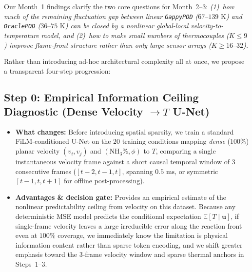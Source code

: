 \documentclass[11pt,letterpaper]{article}
\begin{document}
Our Month~1 findings clarify the two core questions for Month~2--3: \emph{(1)~how much of the remaining fluctuation gap between linear \texttt{GappyPOD} ($67\text{--}139\text{ K}$) and \texttt{OraclePOD} ($36\text{--}75\text{ K}$) can be closed by a nonlinear global-local velocity-to-temperature model, and (2)~how to make small numbers of thermocouples ($K \le 9$) improve flame-front structure rather than only large sensor arrays ($K \ge 16\text{--}32$).}

Rather than introducing ad-hoc architectural complexity all at once, we propose a transparent four-step progression:

\subsection*{Step 0: Empirical Information Ceiling Diagnostic (Dense Velocity $\rightarrow T$ U-Net)}
\begin{itemize}
    \item \textbf{What changes:} Before introducing spatial sparsity, we train a standard FiLM-conditioned U-Net on the 20 training conditions mapping \emph{dense} ($100\%$) planar velocity $(v_i, v_j)$ and $(\text{NH}_3\%, \phi)$ to $T$, comparing a single instantaneous velocity frame against a short causal temporal window of 3 consecutive frames ($[t-2, t-1, t]$, spanning $0.5\text{ ms}$, or symmetric $[t-1, t, t+1]$ for offline post-processing).
    \item \textbf{Advantages \& decision gate:} Provides an empirical estimate of the nonlinear predictability ceiling from velocity on this dataset. Because any deterministic MSE model predicts the conditional expectation $\mathbb{E}[T \mid \mathbf{u}]$, if single-frame velocity leaves a large irreducible error along the reaction front even at $100\%$ coverage, we immediately know the limitation is physical information content rather than sparse token encoding, and we shift greater emphasis toward the 3-frame velocity window and sparse thermal anchors in Steps~1--3.
\end{itemize}
\end{document}

